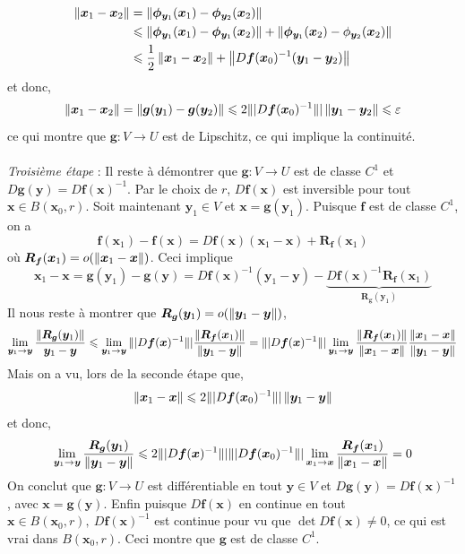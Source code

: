{	\begin{align*}
		\left\| \bm x_1 - \bm x_2 \right\| &= \left\| \bm \phi_{\bm y_1}(\bm x_1) - \bm \phi_{\bm y_2} (\bm x_2) \right\| \\
									& \leqslant \left\| \bm \phi_{\bm y_1} (\bm x_1) - \bm \phi_{\bm y_1} (\bm x_2) \right\| + \left\| \bm \phi_{\bm y_1} (\bm x_2) - \phi_{\bm y_2} (\bm x_2) \right\| \\
									&\leqslant \frac{1}{2} \left\| \bm x_1 - \bm x_2 \right\| + \left\| D \bm f(\bm x_0)^{-1}(\bm y_1 - \bm y_2) \right\|
	\end{align*}
	et donc,
	\[
	\left\| \bm x_1 - \bm x_2 \right\| = \left\| \bm g (\bm y_1) - \bm g(\bm y_2) \right\| \leqslant 2 \|| D \bm f(\bm x_0)^{-1} \|| \left\| \bm y_1 - \bm y_2 \right\| \leqslant \varepsilon
	\]
	ce qui montre que $\bm g : V \to U$ est de Lipschitz, ce qui implique la continuité.
	\\\\
	\textit{Troisième étape} : Il reste à démontrer que $\bm g : V \to U$ est de classe $C^1$ et $D \bm g(\bm y) = D \bm f(\bm x)^{-1}$. Par le choix de $r$, $D \bm f(\bm x)$ est inversible pour tout $\bm x \in B(\bm x_0, r)$. Soit maintenant $\bm y_1 \in V$ et $\bm x = \bm g(\bm y_1)$. Puisque $\bm f$ est de classe $C^1$, on a
	\[
	\bm f(\bm x_1) - \bm f(\bm x) = D \bm f(\bm x) (\bm x_1 - \bm x) + \bm R_{\bm f}(\bm x_1)
	\]
	où $\bm R_{\bm f} (\bm x_1) = o(\left\| \bm x_1 - \bm x \right\|)$. Ceci implique
	\[
	\bm x_1 - \bm x = \bm g(\bm y_1) - \bm g(\bm y) = D\bm f(\bm x)^{-1}(\bm y_1 - \bm y) - \underbrace{D \bm f(\bm x)^{-1} \bm R_{\bm f}(\bm x_1)}_{\bm R_{\bm g}(\bm y_1)}
	\]
	Il nous reste à montrer que $\bm R_{\bm g}(\bm y_1) = o(\left\| \bm y_1 - \bm y \right\|)$,
	\[
	\lim_{\bm y_1 \to \bm y} \frac{\left\| \bm R_{\bm g}(\bm y_1) \right\|}{\bm y_1 - \bm y} \leqslant \lim_{\bm y_1 \to \bm y} \|| D \bm f(\bm x)^{-1} \|| \frac{\left\| \bm R_{\bm f}(\bm x_1) \right\|}{\left\| \bm y_1 - \bm y \right\|} = \|| D \bm f(\bm x)^{-1} \|| \lim_{\bm y_1 \to \bm y} \frac{\left\| \bm R_{\bm f}(\bm x_1) \right\|}{\left\| \bm x_1 - \bm x \right\|} \frac{\left\| \bm x_1 - \bm x \right\|}{\left\| \bm y_1 - \bm y \right\|}
	\]
	Mais on a vu, lors de la seconde étape que,
	\[
	\left\| \bm x_1 - \bm x \right\| \leqslant 2 \|| D \bm f(\bm x_0)^{-1} \|| \left\| \bm y_1 - \bm y \right\|
	\]
	et donc,
	\[
	\lim_{\bm y_1 \to \bm y} \frac{\bm R_{\bm g}(\bm y_1)}{\left\| \bm y_1 - \bm y \right\|} \leqslant 2 \|| D \bm f(\bm x)^{-1} \|| \|| D \bm f(\bm x_0)^{-1} \||  \lim_{\bm x_1 \to \bm x} \frac{\bm R_{\bm f}(\bm x_1)}{\left\| \bm x_1 - \bm x \right\|} = 0
	\]
	On conclut que $\bm g : V \to U$ est différentiable en tout $\bm y \in V$ et $D \bm g(\bm y) = D \bm f(\bm x)^{-1}$, avec $\bm x = \bm g(\bm y)$. Enfin puisque $D \bm f(\bm x)$ en continue en tout $\bm x \in B(\bm x_0, r), ~ D \bm f(\bm x)^{-1}$ est continue pour vu que $\det D \bm f(\bm x) \neq 0$, ce qui est vrai dans $B(\bm x_0, r)$. Ceci montre que $\bm g$ est de classe $C^1$.
}


